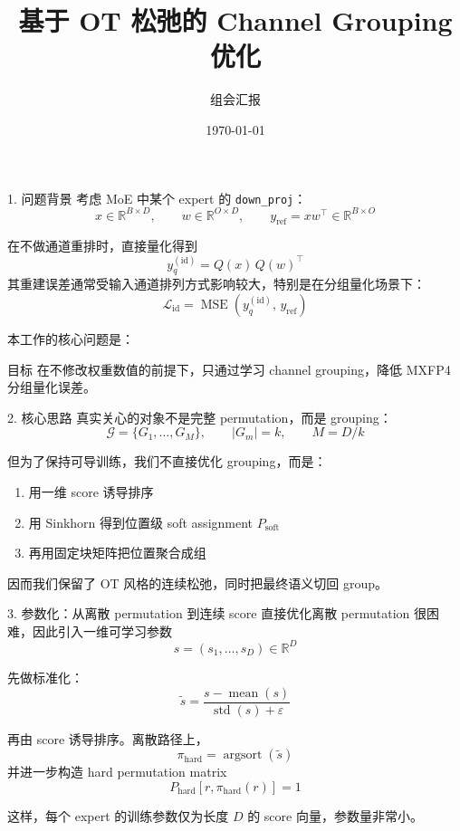 \documentclass[aspectratio=169,professionalfonts]{ctexbeamer}
\title{基于 OT 松弛的 Channel Grouping 优化}
\author{组会汇报}
\date{\today}
\newcommand{\R}{\mathbb{R}}
\newcommand{\Loss}{\mathcal{L}}
\newcommand{\MSE}{\operatorname{MSE}}
\newcommand{\argsort}{\operatorname{argsort}}
\begin{document}
\begin{frame}
  \titlepage
\end{frame}

\begin{frame}{1. 问题背景}
  考虑 MoE 中某个 expert 的 \texttt{down\_proj}：
  \[
    x \in \R^{B \times D},\qquad
    w \in \R^{O \times D},\qquad
    y_{\mathrm{ref}} = x w^\top \in \R^{B \times O}
  \]

  \vspace{0.4em}
  在不做通道重排时，直接量化得到
  \[
    y_q^{(\mathrm{id})} = Q(x)\,Q(w)^\top
  \]
  其重建误差通常受输入通道排列方式影响较大，特别是在分组量化场景下：
  \[
    \Loss_{\mathrm{id}} = \MSE\!\left(y_q^{(\mathrm{id})},\, y_{\mathrm{ref}}\right)
  \]

  \vspace{0.4em}
  本工作的核心问题是：
  \begin{block}{目标}
    在不修改权重数值的前提下，只通过学习 channel grouping，降低 MXFP4 分组量化误差。
  \end{block}
\end{frame}

\begin{frame}{2. 核心思路}
  真实关心的对象不是完整 permutation，而是 grouping：
  \[
    \mathcal{G} = \{G_1,\dots,G_M\}, \qquad |G_m| = k,\qquad M=D/k
  \]

  \vspace{0.4em}
  但为了保持可导训练，我们不直接优化 grouping，而是：
  \begin{enumerate}
    \item 用一维 score 诱导排序
    \item 用 Sinkhorn 得到位置级 soft assignment $P_{\mathrm{soft}}$
    \item 再用固定块矩阵把位置聚合成组
  \end{enumerate}

  \vspace{0.4em}
  因而我们保留了 OT 风格的连续松弛，同时把最终语义切回 group。
\end{frame}

\begin{frame}{3. 参数化：从离散 permutation 到连续 score}
  直接优化离散 permutation 很困难，因此引入一维可学习参数
  \[
    s = (s_1,\dots,s_D) \in \R^D
  \]

  \vspace{0.4em}
  先做标准化：
  \[
    \tilde{s} = \frac{s-\operatorname{mean}(s)}{\operatorname{std}(s)+\varepsilon}
  \]

  \vspace{0.4em}
  再由 score 诱导排序。离散路径上，
  \[
    \pi_{\mathrm{hard}} = \argsort(\tilde{s})
  \]
  并进一步构造 hard permutation matrix
  \[
    P_{\mathrm{hard}}[r,\pi_{\mathrm{hard}}(r)] = 1
  \]

  \vspace{0.4em}
  这样，每个 expert 的训练参数仅为长度 $D$ 的 score 向量，参数量非常小。
\end{frame}
\end{document}
